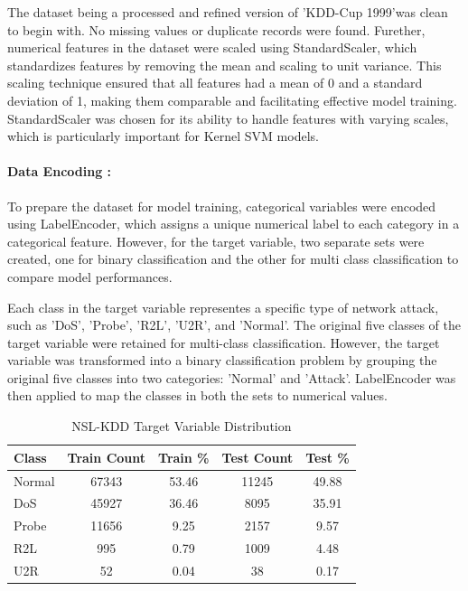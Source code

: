 \documentclass{article}
\begin{document}
The dataset being a processed and refined version of 'KDD-Cup 1999'was clean to begin with. No missing values or duplicate records were found. Furether, numerical features in the dataset were scaled using StandardScaler, which standardizes features by removing the mean and scaling to unit variance. This scaling technique ensured that all features had a mean of 0 and a standard deviation of 1, making them comparable and facilitating effective model training. StandardScaler was chosen for its ability to handle features with varying scales, which is particularly important for Kernel SVM models.

\paragraph{Data Encoding :}

To prepare the dataset for model training, categorical variables were encoded using LabelEncoder, which assigns a unique numerical label to each category in a categorical feature. However, for the target variable, two separate sets were created, one for binary classification and the other for multi class classification to compare model performances. 

Each class in the target variable representes a specific type of network attack, such as 'DoS', 'Probe', 'R2L', 'U2R', and 'Normal'. The original five classes of the target variable were retained for multi-class classification. However, the target variable was transformed into a binary classification problem by grouping the original five classes into two categories: 'Normal' and 'Attack'.  LabelEncoder was then applied to map the classes in both the sets to numerical values.

\begin{table}[htbp]
  \centering
  \caption{NSL-KDD Target Variable Distribution}
  \label{tab:nsl_kdd_distribution}
  \begin{tabular}{@{}lcccc@{}}
  \toprule
  \textbf{Class} & \textbf{Train Count} & \textbf{Train \%} & \textbf{Test Count} & \textbf{Test \%} \\ 
  \midrule
  Normal & 67343 & 53.46 & 11245 & 49.88 \\
  DoS & 45927 & 36.46 & 8095 & 35.91 \\
  Probe & 11656 & 9.25 & 2157 & 9.57 \\
  R2L & 995 & 0.79 & 1009 & 4.48 \\
  U2R & 52 & 0.04 & 38 & 0.17 \\ 
  \bottomrule
  \end{tabular}
\end{table} 
\end{document}
